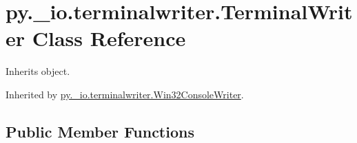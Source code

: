 \hypertarget{classpy_1_1__io_1_1terminalwriter_1_1_terminal_writer}{}\section{py.\+\_\+io.\+terminalwriter.\+Terminal\+Writer Class Reference}
\label{classpy_1_1__io_1_1terminalwriter_1_1_terminal_writer}


Inherits object.



Inherited by \hyperlink{classpy_1_1__io_1_1terminalwriter_1_1_win32_console_writer}{py.\+\_\+io.\+terminalwriter.\+Win32\+Console\+Writer}.

\subsection*{Public Member Functions}
